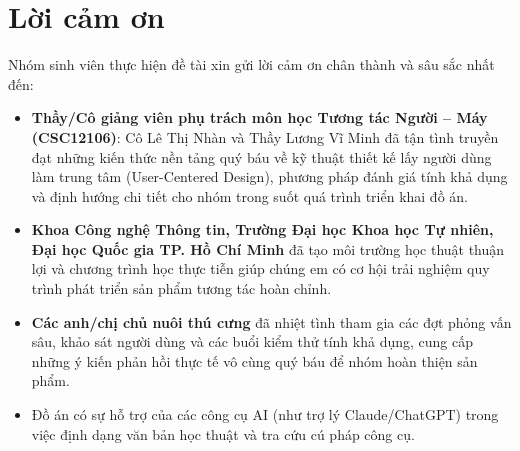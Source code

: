 \newpage
\section*{Lời cảm ơn}

Nhóm sinh viên thực hiện đề tài xin gửi lời cảm ơn chân thành và sâu sắc nhất đến:
\begin{itemize}
    \item \textbf{Thầy/Cô giảng viên phụ trách môn học Tương tác Người -- Máy (CSC12106)}: Cô Lê Thị Nhàn và Thầy Lương Vĩ Minh đã tận tình truyền đạt những kiến thức nền tảng quý báu về kỹ thuật thiết kế lấy người dùng làm trung tâm (User-Centered Design), phương pháp đánh giá tính khả dụng và định hướng chi tiết cho nhóm trong suốt quá trình triển khai đồ án.
    \item \textbf{Khoa Công nghệ Thông tin, Trường Đại học Khoa học Tự nhiên, Đại học Quốc gia TP. Hồ Chí Minh} đã tạo môi trường học thuật thuận lợi và chương trình học thực tiễn giúp chúng em có cơ hội trải nghiệm quy trình phát triển sản phẩm tương tác hoàn chỉnh.
    \item \textbf{Các anh/chị chủ nuôi thú cưng} đã nhiệt tình tham gia các đợt phỏng vấn sâu, khảo sát người dùng và các buổi kiểm thử tính khả dụng, cung cấp những ý kiến phản hồi thực tế vô cùng quý báu để nhóm hoàn thiện sản phẩm.
    \item Đồ án có sự hỗ trợ của các công cụ AI (như trợ lý Claude/ChatGPT) trong việc định dạng văn bản học thuật và tra cứu cú pháp công cụ.
\end{itemize}